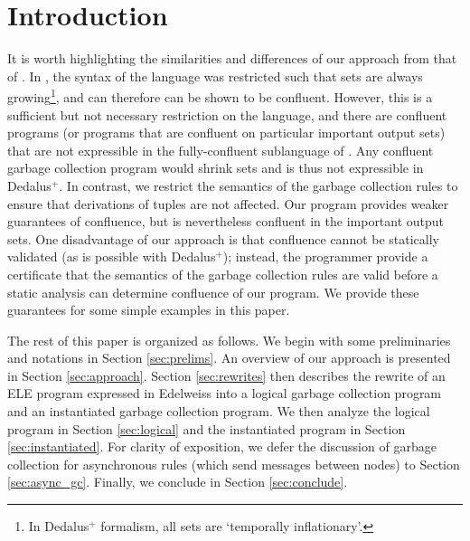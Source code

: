 
\section{Introduction}
\label{sec:intro}


It is worth highlighting the similarities and differences of our approach from that of \cite{marczak2012confluence}.
In \cite{marczak2012confluence}, the syntax of the language was restricted such that sets are always growing\footnote{In Dedalus$^+$ formalism, all sets are `temporally inflationary'.}, and can therefore can be shown to be confluent.
However, this is a sufficient but not necessary restriction on the language, and there are confluent programs (or programs that are confluent on particular important output sets) that are not expressible in the fully-confluent sublanguage of \cite{marczak2012confluence}.
Any confluent garbage collection program would shrink sets and is thus not expressible in Dedalus$^+$.
In contrast, we restrict the semantics of the garbage collection rules to ensure that derivations of tuples are not affected.
Our program provides weaker guarantees of confluence, but is nevertheless confluent in the important output sets.
One disadvantage of our approach is that confluence cannot be statically validated (as is possible with Dedalus$^+$);
instead, the programmer provide a certificate that the semantics of the garbage collection rules are valid before a static analysis can determine confluence of our program.
We provide these guarantees for some simple examples in this paper.


The rest of this paper is organized as follows.
We begin with some preliminaries and notations in Section \ref{sec:prelims}.
An overview of our approach is presented in Section \ref{sec:approach}.
Section \ref{sec:rewrites} then describes the rewrite of an ELE program expressed in Edelweiss into a logical garbage collection program and an instantiated garbage collection program.
We then analyze the logical program in Section \ref{sec:logical} and the instantiated program in Section \ref{sec:instantiated}.
For clarity of exposition, we defer the discussion of garbage collection for asynchronous rules (which send messages between nodes) to Section \ref{sec:async_gc}.
Finally, we conclude in Section \ref{sec:conclude}.
